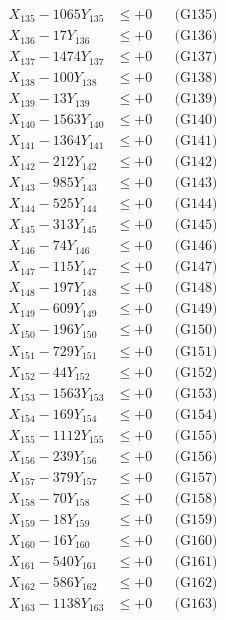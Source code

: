 \documentclass[a4paper,10pt]{article}
\begin{document}
{\begin{align}
X_{135} - 1065Y_{135} &\leq +0 && \text{(G135)} \\
X_{136} - 17Y_{136} &\leq +0 && \text{(G136)} \\
X_{137} - 1474Y_{137} &\leq +0 && \text{(G137)} \\
X_{138} - 100Y_{138} &\leq +0 && \text{(G138)} \\
X_{139} - 13Y_{139} &\leq +0 && \text{(G139)} \\
X_{140} - 1563Y_{140} &\leq +0 && \text{(G140)} \\
\allowbreak
X_{141} - 1364Y_{141} &\leq +0 && \text{(G141)} \\
X_{142} - 212Y_{142} &\leq +0 && \text{(G142)} \\
X_{143} - 985Y_{143} &\leq +0 && \text{(G143)} \\
X_{144} - 525Y_{144} &\leq +0 && \text{(G144)} \\
X_{145} - 313Y_{145} &\leq +0 && \text{(G145)} \\
X_{146} - 74Y_{146} &\leq +0 && \text{(G146)} \\
X_{147} - 115Y_{147} &\leq +0 && \text{(G147)} \\
X_{148} - 197Y_{148} &\leq +0 && \text{(G148)} \\
X_{149} - 609Y_{149} &\leq +0 && \text{(G149)} \\
X_{150} - 196Y_{150} &\leq +0 && \text{(G150)} \\
\allowbreak
X_{151} - 729Y_{151} &\leq +0 && \text{(G151)} \\
X_{152} - 44Y_{152} &\leq +0 && \text{(G152)} \\
X_{153} - 1563Y_{153} &\leq +0 && \text{(G153)} \\
X_{154} - 169Y_{154} &\leq +0 && \text{(G154)} \\
X_{155} - 1112Y_{155} &\leq +0 && \text{(G155)} \\
X_{156} - 239Y_{156} &\leq +0 && \text{(G156)} \\
X_{157} - 379Y_{157} &\leq +0 && \text{(G157)} \\
X_{158} - 70Y_{158} &\leq +0 && \text{(G158)} \\
X_{159} - 18Y_{159} &\leq +0 && \text{(G159)} \\
X_{160} - 16Y_{160} &\leq +0 && \text{(G160)} \\
\allowbreak
X_{161} - 540Y_{161} &\leq +0 && \text{(G161)} \\
X_{162} - 586Y_{162} &\leq +0 && \text{(G162)} \\
X_{163} - 1138Y_{163} &\leq +0 && \text{(G163)} \\

\end{align}}
\end{document}

